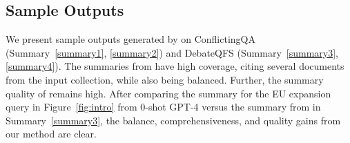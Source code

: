 \subsection{Sample Outputs} \label{appendix:outputs}

We present sample outputs generated by \model on ConflictingQA (Summary~\ref{summary1}, \ref{summary2}) and DebateQFS (Summary~\ref{summary3}, \ref{summary4}).
The summaries from \model have high coverage, citing several documents from the input collection, while also being balanced.
Further, the summary quality of \model remains high.
After comparing the summary for the EU expansion query in Figure~\ref{fig:intro} from 0-shot GPT-4 versus the summary from \model in Summary~\ref{summary3}, the balance, comprehensiveness, and quality gains from our method are clear.

\clearpage
%













\clearpage

